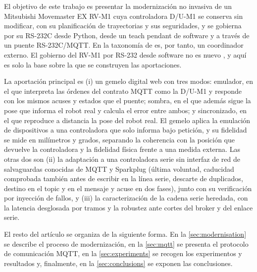 El objetivo de este trabajo es presentar la modernización no invasiva de un Mitsubishi Movemaster EX RV-M1 cuya controladora D/U-M1 se conserva sin modificar, con su planificación de trayectorias y sus seguridades, y se gobierna por su RS-232C desde Python, desde un teach pendant de software y a través de un puente RS-232C/MQTT. En la taxonomía de \citet{bilancia2023overview} es, por tanto, un coordinador externo. El gobierno del RV-M1 por RS-232 desde software no es nuevo \citep{swider2007system,foit2008web,mihali2005effective}, y aquí es solo la base sobre la que se construyen las aportaciones.

La aportación principal es (i) un gemelo digital web con tres modos: emulador, en el que interpreta las órdenes del contrato MQTT como la D/U-M1 y responde con los mismos acuses y estados que el puente; sombra, en el que además sigue la pose que informa el robot real y calcula el error entre ambos; y sincronizado, en el que reproduce a distancia la pose del robot real. El gemelo aplica la emulación de dispositivos a una controladora que solo informa bajo petición, y su fidelidad se mide en milímetros y grados, separando la coherencia con la posición que devuelve la controladora y la fidelidad física frente a una medida externa. Las otras dos son (ii) la adaptación a una controladora serie sin interfaz de red de salvaguardas conocidas de MQTT y Sparkplug (última voluntad, caducidad comprobada también antes de escribir en la línea serie, descarte de duplicados, destino en el topic y en el mensaje y acuse en dos fases), junto con su verificación por inyección de fallos, y (iii) la caracterización de la cadena serie heredada, con la latencia desglosada por tramos y la robustez ante cortes del broker y del enlace serie.

El resto del artículo se organiza de la siguiente forma. En la \cref{sec:modernisation} se describe el proceso de modernización, en la \cref{sec:mqtt} se presenta el protocolo de comunicación MQTT, en la \cref{sec:experiments} se recogen los experimentos y resultados y, finalmente, en la \cref{sec:conclusions} se exponen las conclusiones.
